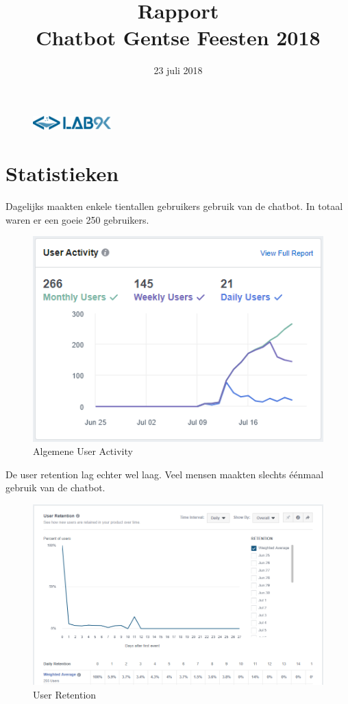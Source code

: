 \documentclass[11pt, letterpaper, oneside]{article}
\title{Rapport \\ Chatbot Gentse Feesten 2018}
\author{}
\date{23 juli 2018}
\begin{document}
	\begin{figure}
			\includegraphics[width=0.27\textwidth,keepaspectratio]{figuren/logo} %
	\end{figure}
	\vspace*{0.35cm}

	\noindent
	\fontsize{30pt}{28pt}\selectfont\textcolor{priColour}{\textbf{\@title}}\newline

	\fontsize{11pt}{15pt}\selectfont


	\section{Statistieken}

	Dagelijks maakten enkele tientallen gebruikers gebruik van de chatbot. In totaal waren er een goeie 250 gebruikers.

	\begin{figure}[h]
		\centering
		\includegraphics[width=0.7\linewidth]{./figuren/user-activity}
		\caption{Algemene User Activity}
		\label{user-activity}
	\end{figure}

	\newpage

	De user retention lag echter wel laag. Veel mensen maakten slechts éénmaal gebruik van de chatbot.

	\begin{figure}[h]
		\centering
		\includegraphics[width=0.7\linewidth]{./figuren/user-retention}
		\caption{User Retention}
		\label{user-retention}
	\end{figure}
\end{document}
